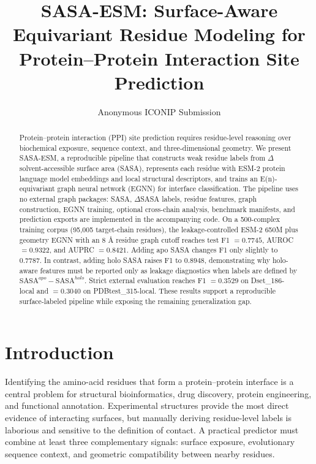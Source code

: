 \documentclass[runningheads]{llncs}
\title{SASA-ESM: Surface-Aware Equivariant Residue Modeling for Protein--Protein Interaction Site Prediction}
\author{Anonymous ICONIP Submission}
\institute{Paper under anonymous review}
\begin{document}
\maketitle

\begin{abstract}
Protein--protein interaction (PPI) site prediction requires residue-level reasoning over
biochemical exposure, sequence context, and three-dimensional geometry. We present
SASA-ESM, a reproducible pipeline that constructs weak residue labels from
\(\Delta\) solvent-accessible surface area (SASA), represents each residue with ESM-2
protein language model embeddings and local structural descriptors, and trains an
E(n)-equivariant graph neural network (EGNN) for interface classification. The pipeline
uses no external graph packages: SASA, \(\Delta\)SASA labels, residue features, graph
construction, EGNN training, optional cross-chain analysis, benchmark manifests, and prediction
exports are implemented in the accompanying code. On a 500-complex training corpus
(95,005 target-chain residues), the leakage-controlled ESM-2 650M plus geometry EGNN
with an 8 \AA{} residue graph cutoff reaches test F1 \(=0.7745\), AUROC \(=0.9322\),
and AUPRC \(=0.8421\). Adding apo SASA changes F1 only slightly to \(0.7787\).
In contrast, adding holo SASA raises F1 to \(0.8948\), demonstrating why holo-aware
features must be reported only as leakage diagnostics when labels are defined by
\(\mathrm{SASA}^{apo}-\mathrm{SASA}^{holo}\). Strict external evaluation reaches F1
\(=0.3529\) on Dset\_186-local and \(=0.3040\) on PDBtest\_315-local. These results
support a reproducible surface-labeled pipeline while exposing the remaining
generalization gap.

\end{abstract}

\section{Introduction}

Identifying the amino-acid residues that form a protein--protein interface is a central
problem for structural bioinformatics, drug discovery, protein engineering, and functional
annotation. Experimental structures provide the most direct evidence of interacting
surfaces, but manually deriving residue-level labels is laborious and sensitive to the
definition of contact. A practical predictor must combine at least three complementary
signals: surface exposure, evolutionary sequence context, and geometric compatibility
between nearby residues.
\end{document}
